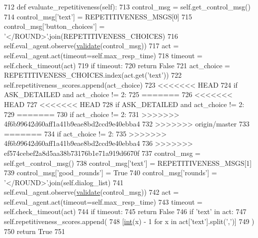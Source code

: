 \begin{DoxyCode}
712     \textcolor{keyword}{def }evaluate\_repetitiveness(self):
713         control\_msg = self.get\_control\_msg()
714         control\_msg[\textcolor{stringliteral}{'text'}] = REPETITIVENESS\_MSGS[0]
715         control\_msg[\textcolor{stringliteral}{'button\_choices'}] = \textcolor{stringliteral}{'</ROUND>'}.join(REPETITIVENESS\_CHOICES)
716         self.eval\_agent.observe(\hyperlink{namespaceparlai_1_1core_1_1worlds_afc3fad603b7bce41dbdc9cdc04a9c794}{validate}(control\_msg))
717         act = self.eval\_agent.act(timeout=self.max\_resp\_time)
718         timeout = self.check\_timeout(act)
719         \textcolor{keywordflow}{if} timeout:
720             \textcolor{keywordflow}{return} \textcolor{keyword}{False}
721         act\_choice = REPETITIVENESS\_CHOICES.index(act.get(\textcolor{stringliteral}{'text'}))
722         self.repetitiveness\_scores.append(act\_choice)
723 <<<<<<< HEAD
724         \textcolor{keywordflow}{if} ASK\_DETAILED \textcolor{keywordflow}{and} act\_choice != 2:
725 =======
726 <<<<<<< HEAD
727 <<<<<<< HEAD
728         \textcolor{keywordflow}{if} ASK\_DETAILED \textcolor{keywordflow}{and} act\_choice != 2:
729 =======
730         \textcolor{keywordflow}{if} act\_choice != 2:
731 >>>>>>> 4f6b99642d60aff1a41b9eae8bd2ccd9e40ebba4
732 >>>>>>> origin/master
733 =======
734         \textcolor{keywordflow}{if} act\_choice != 2:
735 >>>>>>> 4f6b99642d60aff1a41b9eae8bd2ccd9e40ebba4
736 >>>>>>> ef574cebef2a8d5aa38b73176b1e71a919d6670f
737             control\_msg = self.get\_control\_msg()
738             control\_msg[\textcolor{stringliteral}{'text'}] = REPETITIVENESS\_MSGS[1]
739             control\_msg[\textcolor{stringliteral}{'good\_rounds'}] = \textcolor{keyword}{True}
740             control\_msg[\textcolor{stringliteral}{'rounds'}] = \textcolor{stringliteral}{'</ROUND>'}.join(self.dialog\_list)
741             self.eval\_agent.observe(\hyperlink{namespaceparlai_1_1core_1_1worlds_afc3fad603b7bce41dbdc9cdc04a9c794}{validate}(control\_msg))
742             act = self.eval\_agent.act(timeout=self.max\_resp\_time)
743             timeout = self.check\_timeout(act)
744             \textcolor{keywordflow}{if} timeout:
745                 \textcolor{keywordflow}{return} \textcolor{keyword}{False}
746             \textcolor{keywordflow}{if} \textcolor{stringliteral}{'text'} \textcolor{keywordflow}{in} act:
747                 self.repetitiveness\_scores.append(
748                     [\hyperlink{namespacelanguage__model_1_1eval__ppl_a7d12ee00479673c5c8d1f6d01faa272a}{int}(x) - 1 \textcolor{keywordflow}{for} x \textcolor{keywordflow}{in} act[\textcolor{stringliteral}{'text'}].split(\textcolor{stringliteral}{','})]
749                 )
750         \textcolor{keywordflow}{return} \textcolor{keyword}{True}
751 
\end{DoxyCode}
